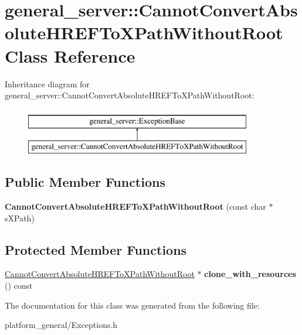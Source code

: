 \hypertarget{classgeneral__server_1_1CannotConvertAbsoluteHREFToXPathWithoutRoot}{\section{general\-\_\-server\-:\-:\-Cannot\-Convert\-Absolute\-H\-R\-E\-F\-To\-X\-Path\-Without\-Root \-Class \-Reference}
\label{classgeneral__server_1_1CannotConvertAbsoluteHREFToXPathWithoutRoot}
}
\-Inheritance diagram for general\-\_\-server\-:\-:\-Cannot\-Convert\-Absolute\-H\-R\-E\-F\-To\-X\-Path\-Without\-Root\-:\begin{figure}[H]
\begin{center}
\leavevmode
\includegraphics[height=2.000000cm]{classgeneral__server_1_1CannotConvertAbsoluteHREFToXPathWithoutRoot}
\end{center}
\end{figure}
\subsection*{\-Public \-Member \-Functions}
\begin{DoxyCompactItemize}
\item 
\hypertarget{classgeneral__server_1_1CannotConvertAbsoluteHREFToXPathWithoutRoot_ace553926d1fc9167d69a0da725884f8e}{{\bfseries \-Cannot\-Convert\-Absolute\-H\-R\-E\-F\-To\-X\-Path\-Without\-Root} (const char $\ast$s\-X\-Path)}\label{classgeneral__server_1_1CannotConvertAbsoluteHREFToXPathWithoutRoot_ace553926d1fc9167d69a0da725884f8e}

\end{DoxyCompactItemize}
\subsection*{\-Protected \-Member \-Functions}
\begin{DoxyCompactItemize}
\item 
\hypertarget{classgeneral__server_1_1CannotConvertAbsoluteHREFToXPathWithoutRoot_a187ade37a5aa236f630ada341a5808d6}{\hyperlink{classgeneral__server_1_1CannotConvertAbsoluteHREFToXPathWithoutRoot}{\-Cannot\-Convert\-Absolute\-H\-R\-E\-F\-To\-X\-Path\-Without\-Root} $\ast$ {\bfseries clone\-\_\-with\-\_\-resources} () const }\label{classgeneral__server_1_1CannotConvertAbsoluteHREFToXPathWithoutRoot_a187ade37a5aa236f630ada341a5808d6}

\end{DoxyCompactItemize}


\-The documentation for this class was generated from the following file\-:\begin{DoxyCompactItemize}
\item 
platform\-\_\-general/\-Exceptions.\-h\end{DoxyCompactItemize}
